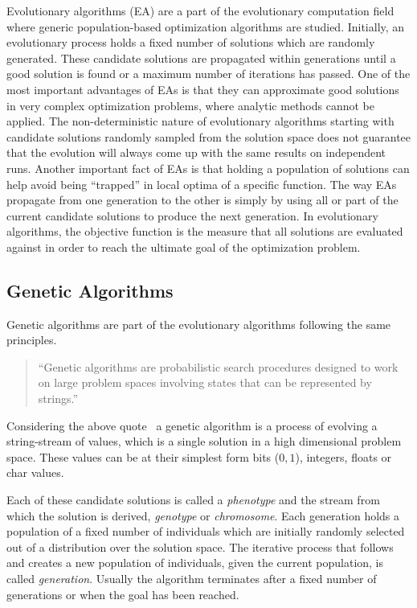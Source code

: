 Evolutionary algorithms (EA) are a part of the evolutionary computation field where generic population-based optimization algorithms are studied. Initially, an evolutionary process holds a fixed number of solutions which are randomly generated. These candidate solutions are propagated within generations until a good solution is found or a maximum number of iterations has passed. One of the most important advantages of EAs is that they can approximate good solutions in very complex optimization problems, where analytic methods cannot be applied. The non-deterministic nature of evolutionary algorithms starting with candidate solutions randomly sampled from the solution space does not guarantee that the evolution will always come up with the same results on independent runs. Another important fact of EAs is that holding a population of solutions can help avoid being ``trapped'' in local optima of a specific function. The way EAs propagate from one generation to the other is simply by using all or part of the current candidate solutions to produce the next generation. In evolutionary algorithms, the objective function is the measure that all solutions are evaluated against in order to reach the ultimate goal of the optimization problem.




\subsection{Genetic Algorithms}
\label{geneticAlgorithms}
Genetic algorithms are part of the evolutionary algorithms following the same principles.

\begin{quote}``Genetic algorithms are probabilistic search procedures designed to work on
large problem spaces involving states that can be represented by strings.''\end{quote}

Considering the above quote~\citep{goldberg1988genetic} a genetic algorithm is a process of evolving a string-stream of values, which is a single solution in a high dimensional problem space. These values can be at their simplest form bits ($0, 1$), integers, floats or char values.

Each of these candidate solutions is called a \emph{phenotype} and the stream from which the solution is derived, \emph{genotype} or \emph{chromosome}. Each generation holds a population of a fixed number of individuals which are initially randomly selected out of a distribution over the solution space. The iterative process that follows and creates a new population of individuals, given the current population, is called \emph{generation}. Usually the algorithm terminates after a fixed number of generations or when the goal has been reached. 

